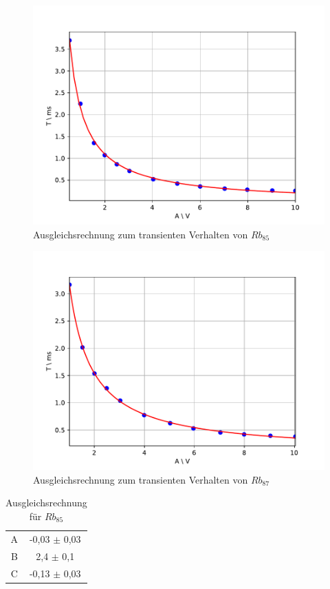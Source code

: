 \begin{figure}[h]
\centering
\includegraphics[scale=0.8]{img/trans1.pdf}
\caption{Ausgleichsrechnung zum transienten Verhalten von $Rb_{85}$}
\label{trans1}
\end{figure}

\begin{figure}[h]
\centering
\includegraphics[scale=0.8]{img/trans2.pdf}
\caption{Ausgleichsrechnung zum transienten Verhalten von $Rb_{87}$}
\label{trans2}
\end{figure}

\begin{table}[h!]
\centering
\begin{tabular}{cc} \toprule
\centering
A & -0,03 $\pm$ 0,03 \\
B & 2,4 $\pm$ 0,1 \\
C & -0,13 $\pm$ 0,03 \\
\bottomrule
\end{tabular}
\label{x}
\caption{Ausgleichsrechnung für $Rb_{85}$}
\end{table}

